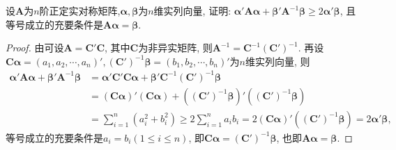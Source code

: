 \documentclass[../../main.tex]{subfiles}
\begin{document}
\begin{example}
设$\boldsymbol{A}$为$n$阶正定实对称矩阵,$\boldsymbol{\alpha}, \boldsymbol{\beta}$为$n$维实列向量, 证明: $\boldsymbol{\alpha}'\boldsymbol{A}\boldsymbol{\alpha}+\boldsymbol{\beta}'\boldsymbol{A}^{-1}\boldsymbol{\beta}\geq 2\boldsymbol{\alpha}'\boldsymbol{\beta}$, 且等号成立的充要条件是$\boldsymbol{A}\boldsymbol{\alpha}=\boldsymbol{\beta}$.
\end{example}
\begin{proof}
由可设$\boldsymbol{A}=\boldsymbol{C}'\boldsymbol{C}$, 其中$\boldsymbol{C}$为非异实矩阵, 则$\boldsymbol{A}^{-1}=\boldsymbol{C}^{-1}(\boldsymbol{C}')^{-1}$. 再设$\boldsymbol{C}\boldsymbol{\alpha}=(a_1, a_2, \cdots, a_n)', (\boldsymbol{C}')^{-1}\boldsymbol{\beta}=(b_1, b_2, \cdots, b_n)'$为$n$维实列向量, 则
\begin{align*}
\boldsymbol{\alpha}'\boldsymbol{A}\boldsymbol{\alpha}+\boldsymbol{\beta}'\boldsymbol{A}^{-1}\boldsymbol{\beta} 
&= \boldsymbol{\alpha}'\boldsymbol{C}'\boldsymbol{C}\boldsymbol{\alpha}+\boldsymbol{\beta}'\boldsymbol{C}^{-1}(\boldsymbol{C}')^{-1}\boldsymbol{\beta}\\
&= (\boldsymbol{C}\boldsymbol{\alpha})'(\boldsymbol{C}\boldsymbol{\alpha})+((\boldsymbol{C}')^{-1}\boldsymbol{\beta})'((\boldsymbol{C}')^{-1}\boldsymbol{\beta})\\
&= \sum_{i = 1}^n (a_i^2 + b_i^2)\geq 2\sum_{i = 1}^n a_ib_i = 2(\boldsymbol{C}\boldsymbol{\alpha})'((\boldsymbol{C}')^{-1}\boldsymbol{\beta}) = 2\boldsymbol{\alpha}'\boldsymbol{\beta},
\end{align*}
等号成立的充要条件是$a_i = b_i (1\leq i\leq n)$, 即$\boldsymbol{C}\boldsymbol{\alpha}=(\boldsymbol{C}')^{-1}\boldsymbol{\beta}$, 也即$\boldsymbol{A}\boldsymbol{\alpha}=\boldsymbol{\beta}$. 
\end{proof}
\end{document}
